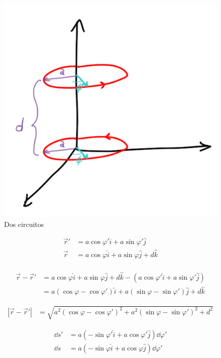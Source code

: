 \documentclass[11pt]{report}
\theoremstyle{plain}
\theoremstyle{definition}
\begin{document}
	
	\begin{figure}[!h]
		\centering
		\includegraphics[scale=0.15]{Tarea2_figura.png}
		\caption{Dos circuitos}
		\label{fig:Tarea2}
	\end{figure}
	
	\begin{align*}
		\vec{r}' &= a\cos\varphi'\hat{i} + a\sin\varphi'\hat{j}\\
		\vec{r} &= a\cos\varphi\hat{i} + a\sin\varphi\hat{j}+d\hat{k}\\
	\end{align*}
	
	\begin{align*}
		\vec{r} - \vec{r}' &= a\cos\varphi\hat{i} + a\sin\varphi\hat{j}+d\hat{k} - (a\cos\varphi'\hat{i} + a\sin\varphi'\hat{j})\\
		&= a(\cos\varphi-\cos\varphi')\hat{i} + a(\sin\varphi-\sin\varphi')\hat{j} + d\hat{k}
	\end{align*}
	
	\begin{align*}
		|\vec{r} - \vec{r}'| &= \sqrt{a^2(\cos\varphi-\cos\varphi')^2 + a^2(\sin\varphi-\sin\varphi')^2 + d^2}
	\end{align*}
	
	\begin{align*}
		\dd{s'} &= a \left(-\sin\varphi'\hat{i} + a\cos\varphi'\hat{j}\right)\dd{\varphi'}\\
		\dd{s} &= a \left(-\sin\varphi\hat{i} + a\cos\varphi\hat{j}\right)\dd{\varphi'}
	\end{align*}
	
\end{document}
